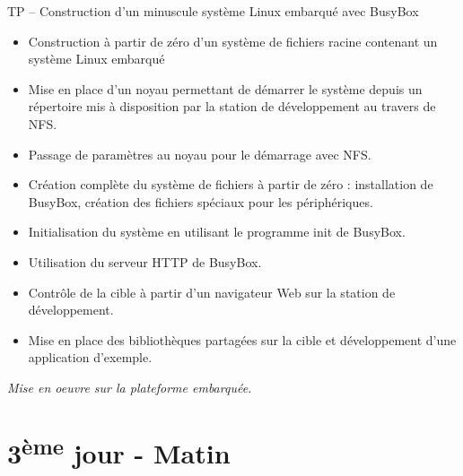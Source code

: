 \documentclass[a4paper,12pt,obeyspaces,spaces,hyphens]{article}
\begin{document}
\feagendaonecolumn
{TP – Construction d'un minuscule système Linux embarqué avec BusyBox}
{
  \begin{itemize}
  \item Construction à partir de zéro d'un système de fichiers racine
    contenant un système Linux embarqué
  \item Mise en place d'un noyau permettant de démarrer le système
    depuis un répertoire mis à disposition par la station de
    développement au travers de NFS.
  \item Passage de paramètres au noyau pour le démarrage avec NFS.
  \item Création complète du système de fichiers à partir de zéro :
    installation de BusyBox, création des fichiers spéciaux pour les
    périphériques.
  \item Initialisation du système en utilisant le programme init de BusyBox.
  \item Utilisation du serveur HTTP de BusyBox.
  \item Contrôle de la cible à partir d'un navigateur Web sur la
    station de développement.
  \item Mise en place des bibliothèques partagées sur la cible et
    développement d'une application d'exemple.
  \end{itemize}

  \vspace{0.5cm}
  {\em Mise en oeuvre sur la plateforme embarquée.}
}

\section{3\textsuperscript{ème} jour - Matin}
\end{document}
